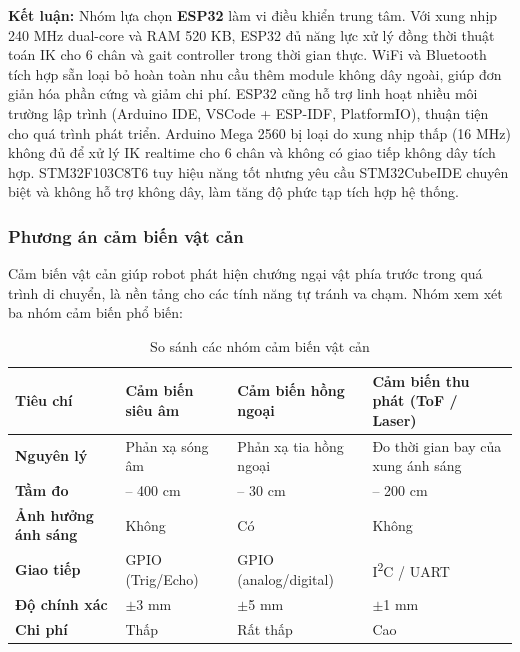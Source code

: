             \textbf{Kết luận:} Nhóm lựa chọn \textbf{ESP32} làm vi điều khiển trung tâm. Với xung nhịp 240 MHz dual-core và RAM 520 KB, ESP32 đủ năng lực xử lý đồng thời thuật toán IK cho 6 chân và gait controller trong thời gian thực. WiFi và Bluetooth tích hợp sẵn loại bỏ hoàn toàn nhu cầu thêm module không dây ngoài, giúp đơn giản hóa phần cứng và giảm chi phí. ESP32 cũng hỗ trợ linh hoạt nhiều môi trường lập trình (Arduino IDE, VSCode + ESP-IDF, PlatformIO), thuận tiện cho quá trình phát triển. Arduino Mega 2560 bị loại do xung nhịp thấp (16 MHz) không đủ để xử lý IK realtime cho 6 chân và không có giao tiếp không dây tích hợp. STM32F103C8T6 tuy hiệu năng tốt nhưng yêu cầu STM32CubeIDE chuyên biệt và không hỗ trợ không dây, làm tăng độ phức tạp tích hợp hệ thống.

                        \subsubsection{Phương án cảm biến vật cản}

            \hspace{0.5cm} Cảm biến vật cản giúp robot phát hiện chướng ngại vật phía trước trong quá trình di chuyển, là nền tảng cho các tính năng tự tránh va chạm. Nhóm xem xét ba nhóm cảm biến phổ biến:

            \begin{table}[H]
            \centering
            \caption{So sánh các nhóm cảm biến vật cản}
            \label{tab:sensor_options}
            \begin{tabular}{|>{\centering\arraybackslash}m{2.5cm}|>{\centering\arraybackslash}m{3.8cm}|>{\centering\arraybackslash}m{3.8cm}|>{\centering\arraybackslash}m{3.8cm}|}
            \hline
            \textbf{Tiêu chí} & \textbf{Cảm biến siêu âm} & \textbf{Cảm biến hồng ngoại} & \textbf{Cảm biến thu phát (ToF / Laser)} \\
            \hline
            \textbf{Nguyên lý} & Phản xạ sóng âm & Phản xạ tia hồng ngoại & Đo thời gian bay của xung ánh sáng \\
            \hline
            \textbf{Tầm đo} & 2 -- 400 cm & 2 -- 30 cm & 3 -- 200 cm \\
            \hline
            \textbf{Ảnh hưởng ánh sáng} & Không & Có & Không \\
            \hline
            \textbf{Giao tiếp} & GPIO (Trig/Echo) & GPIO (analog/digital) & I\textsuperscript{2}C / UART \\
            \hline
            \textbf{Độ chính xác} & $\pm$3 mm & $\pm$5 mm & $\pm$1 mm \\
            \hline
            \textbf{Chi phí} & Thấp & Rất thấp & Cao \\
            \hline
            \end{tabular}
            \end{table}

